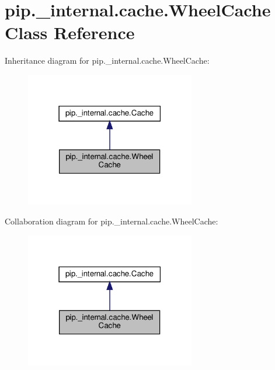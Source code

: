\hypertarget{classpip_1_1__internal_1_1cache_1_1WheelCache}{}\section{pip.\+\_\+internal.\+cache.\+Wheel\+Cache Class Reference}
\label{classpip_1_1__internal_1_1cache_1_1WheelCache}


Inheritance diagram for pip.\+\_\+internal.\+cache.\+Wheel\+Cache\+:
\nopagebreak
\begin{figure}[H]
\begin{center}
\leavevmode
\includegraphics[width=210pt]{classpip_1_1__internal_1_1cache_1_1WheelCache__inherit__graph}
\end{center}
\end{figure}


Collaboration diagram for pip.\+\_\+internal.\+cache.\+Wheel\+Cache\+:
\nopagebreak
\begin{figure}[H]
\begin{center}
\leavevmode
\includegraphics[width=210pt]{classpip_1_1__internal_1_1cache_1_1WheelCache__coll__graph}
\end{center}
\end{figure}

